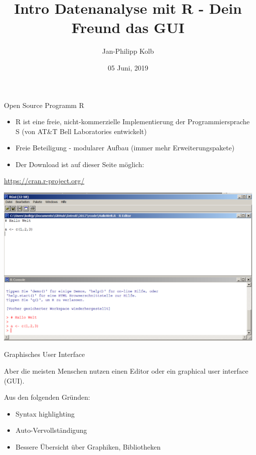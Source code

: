 \documentclass[ignorenonframetext,]{beamer}
\title{Intro Datenanalyse mit R - Dein Freund das GUI}
\author{Jan-Philipp Kolb}
\date{05 Juni, 2019}
\providecommand{\tightlist}{%
  \setlength{\itemsep}{0pt}\setlength{\parskip}{0pt}}
\begin{document}
\frame{\titlepage}

\begin{frame}{Open Source Programm R}

\begin{itemize}
\item
  R ist eine freie, nicht-kommerzielle Implementierung der
  Programmiersprache S (von AT\&T Bell Laboratories entwickelt)
\item
  Freie Beteiligung - modularer Aufbau (immer mehr Erweiterungspakete)
\item
  Der Download ist auf dieser Seite möglich:
\end{itemize}

\url{https://cran.r-project.org/}

\includegraphics{figure/BasisR.PNG}

\end{frame}

\begin{frame}{Graphisches User Interface}

Aber die meisten Menschen nutzen einen Editor oder ein graphical user
interface (GUI).

Aus den folgenden Gründen:

\begin{itemize}
\tightlist
\item
  Syntax highlighting
\item
  Auto-Vervollständigung
\item
  Bessere Übersicht über Graphiken, Bibliotheken
\end{itemize}

\end{frame}
\end{document}
